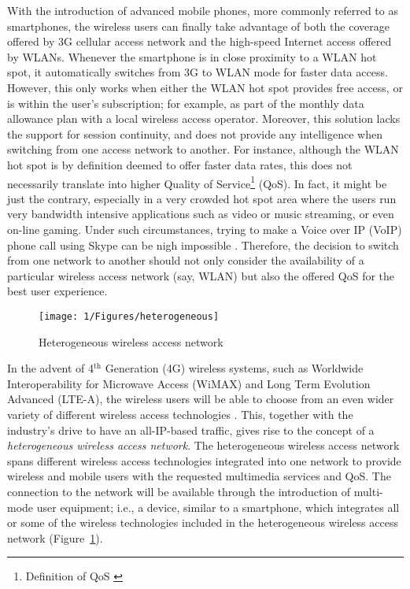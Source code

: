 With the introduction of advanced mobile phones, more commonly referred to as smartphones, the wireless users can finally take advantage of both the coverage offered by 3G cellular access network and the high-speed Internet access offered by WLANs. Whenever the smartphone is in close proximity to a WLAN hot spot, it automatically switches from 3G to WLAN mode for faster data access. However, this only works when either the WLAN hot spot provides free access, or is within the user's subscription; for example, as part of the monthly data allowance plan with a local wireless access operator. Moreover, this solution lacks the support for session continuity, and does not provide any intelligence when switching from one access network to another. For instance, although the WLAN hot spot is by definition deemed to offer faster data rates, this does not necessarily translate into higher Quality of Service\footnote{Definition of QoS \cite{XiaoQoS08}} (QoS). In fact, it might be just the contrary, especially in a very crowded hot spot area where the users run very bandwidth intensive applications such as video or music streaming, or even on-line gaming. Under such circumstances, trying to make a Voice over IP (VoIP) phone call using Skype can be nigh impossible \cite{Wisely4gWLAN09}. Therefore, the decision to switch from one network to another should not only consider the availability of a particular wireless access network (say, WLAN) but also the offered QoS for the best user experience.
\begin{figure}[ht]
	\centering
	\texttt{[image: 1/Figures/heterogeneous]}
	\caption{Heterogeneous wireless access network}
	\label{fig:ch1_heterogeneous}
\end{figure}

In the advent of 4$^{\text{th}}$ Generation (4G) wireless systems, such as Worldwide Interoperability for Microwave Access (WiMAX) and Long Term Evolution Advanced (LTE-A), the wireless users will be able to choose from an even wider variety of different wireless access technologies \cite{HossainBeaubrun09, HossainTalebiFard09}. This, together with the industry's drive to have an all-IP-based traffic, gives rise to the concept of a \emph{heterogeneous wireless access network}. The heterogeneous wireless access network spans different wireless access technologies integrated into one network to provide wireless and mobile users with the requested multimedia services and QoS. The connection to the network will be available through the introduction of multi-mode user equipment; i.e., a device, similar to a smartphone, which integrates all or some of the wireless technologies included in the heterogeneous wireless access network (Figure~\ref{fig:ch1_heterogeneous}).


